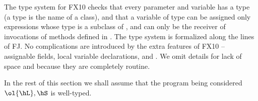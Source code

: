 

The type system for FX10 checks that every parameter and variable has
a type (a type is the name of a class), and that a variable of type
\hC can be assigned only expressions whose type is a subclass of \hC,
and can only be the receiver of invocations of methods defined in
\hC. The type system is formalized along the lines of FJ. No
complications are introduced by the extra features of FX10 --
assignable fields, local variable declarations, \hfinish{} and
\hasync{}. We omit details for lack of space and because they are
completely routine.

In the rest of this section we shall assume that the program being
considered $\ol{\hL},\hS$ is well-typed.

